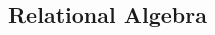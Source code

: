 \subsection{Relational Algebra}%
\label{sub:relational-algebra}

\begin{multicols}{3}
    

\end{multicols}
